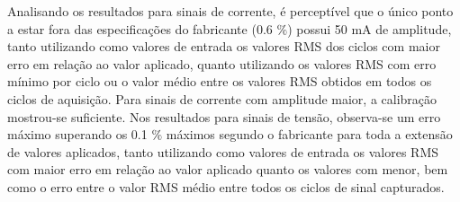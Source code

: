 \begin{table}[htb]
\end{table}

Analisando os resultados para sinais de corrente, é perceptível que o único ponto a estar fora das especificações do fabricante (0.6 $\%$) possui 50 mA de amplitude, tanto utilizando como valores de entrada os valores RMS dos ciclos com maior erro em relação ao valor aplicado, quanto utilizando os valores RMS com erro mínimo por ciclo ou o valor médio entre os valores RMS obtidos em todos os ciclos de aquisição.  Para sinais de corrente com amplitude maior, a calibração mostrou-se suficiente. Nos resultados para sinais de tensão, observa-se um erro máximo superando os 0.1 $\%$ máximos segundo o fabricante para toda a extensão de valores aplicados, tanto utilizando como valores de entrada os valores RMS com maior erro em relação ao valor aplicado quanto os valores com menor, bem como o erro entre o valor RMS médio entre todos os ciclos de sinal capturados. 

